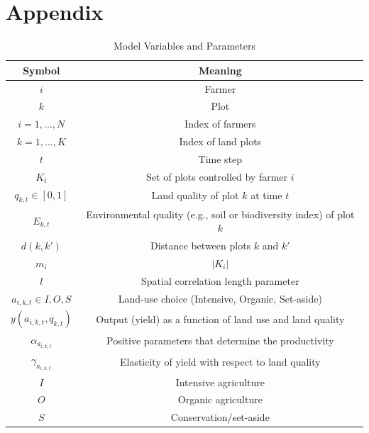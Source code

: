 \documentclass{article}
\begin{document}
\section*{Appendix}
\begin{table} [hbt!]
    \centering
\caption{Model Variables and Parameters}
\label{tab:placeholder}
    \begin{tabular}{|c|c|}\hline
         Symbol&  Meaning\\\hline
 $i$&Farmer\\\hline
 $k$&Plot\\\hline
         $i = 1,..., N$&  Index of farmers\\\hline
         $k = 1,..., K$&  Index of land plots\\ \hline
 $t$&Time step\\\hline
 $K_i$&Set of plots controlled by farmer $i$\\\hline
 $q_{k,t​}∈[0,1]$&Land quality of plot $k$ at time $t$\\\hline
 $E_{k,t}$&Environmental quality (e.g., soil or biodiversity index) of plot $k$\\\hline
 $d(k,k')$&Distance between plots $k$ and $k'$\\\hline
 $m_i$&$|K_i|$\\\hline
 $l$&Spatial correlation length parameter\\\hline
 $a_{i,k,t​}∈{I,O,S}$&Land-use choice (Intensive, Organic, Set-aside)\\\hline
 $y(a_{i,k,t}, q_{k,t})$&Output (yield) as a function of land use and land quality\\\hline
 $\alpha_{a_{i,k,t}}$ &Positive parameters that determine the productivity \\\hline
 $\gamma_{a_{i,k,t}}$&Elasticity of yield with respect to land quality\\\hline
 $I$ &Intensive agriculture\\\hline
 $O$ &Organic agriculture\\\hline
 $S$ &Conservation/set-aside\\\hline
 

\end{tabular}
\end{table}
\end{document}
